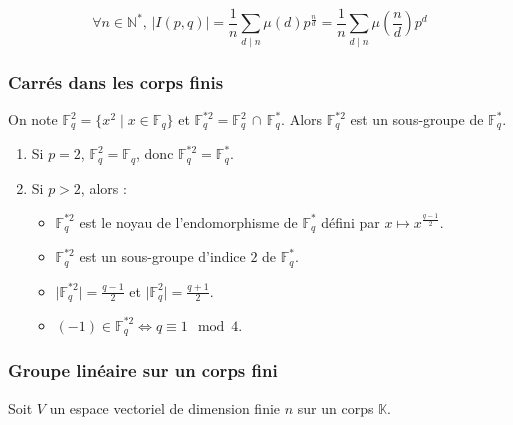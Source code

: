	\begin{corollary}
		\[ \forall n \in \mathbb{N}^*, \, \vert I(p,q) \vert = \frac{1}{n} \sum_{d \mid n} \mu(d) p^{\frac{n}{d}} = \frac{1}{n} \sum_{d \mid n} \mu \left( \frac{n}{d} \right) p^{d} \]
	\end{corollary}
	
	\subsubsection{Carrés dans les corps finis}
	
	
	\begin{proposition}
		On note $\mathbb{F}_q^2 = \{ x^2 \mid x \in \mathbb{F}_q \}$ et $\mathbb{F}_q^{*2} = \mathbb{F}_q^2 \, \cap \, \mathbb{F}_q^*$. Alors $\mathbb{F}_q^{*2}$ est un sous-groupe de $\mathbb{F}_q^*$.
	\end{proposition}
	
	\begin{proposition}
		\begin{enumerate}[label=(\roman*)]
			\item Si $p = 2$, $\mathbb{F}_q^2 = \mathbb{F}_q$, donc $\mathbb{F}_q^{*2} = \mathbb{F}_q^*$.
			\item Si $p > 2$, alors :
			\begin{itemize}
				\item $\mathbb{F}_q^{*2}$ est le noyau de l'endomorphisme de $\mathbb{F}_q^*$ défini par $x \mapsto x^{\frac{q-1}{2}}$.
				\item $\mathbb{F}_q^{*2}$ est un sous-groupe d'indice $2$ de $\mathbb{F}_q^*$.
				\item $\vert \mathbb{F}_q^{*2} \vert = \frac{q-1}{2}$ et $\vert \mathbb{F}_q^2 \vert = \frac{q+1}{2}$.
				\item $(-1) \in \mathbb{F}_q^{*2} \iff q \equiv 1 \mod 4$.
			\end{itemize}
		\end{enumerate}
	\end{proposition}
	
	\subsubsection{Groupe linéaire sur un corps fini}
	
	
	Soit $V$ un espace vectoriel de dimension finie $n$ sur un corps $\mathbb{K}$.
	
